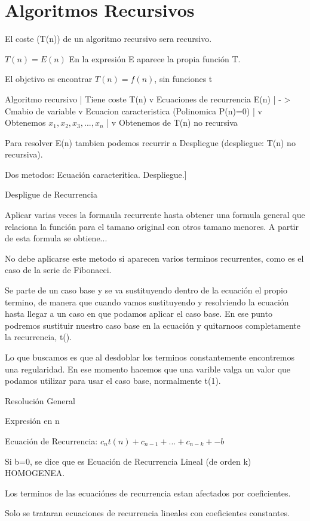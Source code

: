 \section{Algoritmos Recursivos}\label{sec:algoritmos-recursivos}
El coste (T(n)) de un algoritmo recursivo sera recursivo.

$T(n)= E(n)$ En la expresión E aparece la propia función T.

El objetivo es encontrar $T(n)= f(n)$, sin funciones t

Algoritmo recursivo
| Tiene coste T(n)
v
Ecuaciones de recurrencia E(n)
| - > Cmabio de variable
v
Ecuacion caracteristica (Polinomica P(n)=0)
|
v
Obtenemos $x_1, x_2, x_3, ..., x_n$
|
v
Obtenemos de T(n) no recursiva

Para resolver E(n) tambien podemos recurrir a Despliegue (despliegue: T(n) no recursiva).

Dos metodos:
  Ecuación caracteritica.
  Despliegue.]


Despligue de Recurrencia

Aplicar varias veces la formaula recurrente hasta obtener una formula general que relaciona la función para el tamano original con otros tamano menores. A partir de esta formula se obtiene...

No debe aplicarse este metodo si aparecen varios terminos recurrentes, como es el caso de la serie de Fibonacci.

Se parte de un caso base y se va sustituyendo dentro de la ecuación el propio termino, de manera que cuando vamos sustituyendo y resolviendo la ecuación hasta llegar a un caso en que podamos aplicar el caso base. En ese punto podremos sustituir nuestro caso base en la ecuación y quitarnoos completamente la recurrencia, t().

Lo que buscamos es que al desdoblar los terminos constantemente encontremos una regularidad. En ese momento hacemos que una varible valga un valor que podamos utilizar para usar el caso base, normalmente t(1).



Resolución General

Expresión en n

Ecuación de Recurrencia: $c_n t(n)+ c_{n-1}+ ... + c_{n-k} +- b$

Si b=0, se dice que es Ecuación de Recurrencia Lineal (de orden k) HOMOGENEA.

Los terminos de las ecuaciónes de recurrencia estan afectados por coeficientes.

Solo se trataran ecuaciones de recurrencia lineales con coeficientes constantes.



